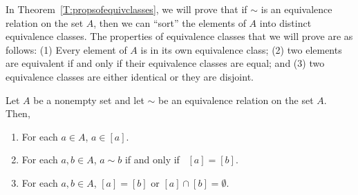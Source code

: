 In Theorem~\ref{T:propsofequivclasses}, we will prove that if  $\sim$  is an equivalence relation on the set  $A$, then we can ``sort'' the elements of  $A$  into distinct equivalence classes.  The properties of equivalence classes that we will prove are as follows: 
%
(1) Every element of  $A$  is in its own equivalence class; (2) two elements are equivalent if and only if their equivalence classes are equal; and (3) two equivalence classes are either identical or they are disjoint.  
%
\begin{theorem} \label{T:propsofequivclasses}
Let  $A$  be a nonempty set and let $\sim$  be an equivalence relation on the set $A$. Then, 
\begin{enumerate}
\item For each  $a \in A$,  $a \in [ a ]$.
\label{T:propsofequivclasses1}%

\item For each  $a, b \in A$, $a \sim b$  if and only if \,   
$[ a ] = [ b ]$.
\label{T:propsofequivclasses2}%

\item For each  $a, b \in A$,   $[ a ] = [ b ]$  or  
$[ a ] \cap [ b ] = \emptyset $.
\label{T:propsofequivclasses3}%
\end{enumerate}
\end{theorem}
%
